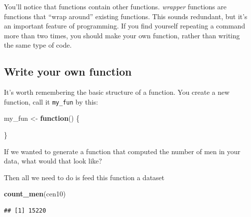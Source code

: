 \documentclass[
]{book}
\newenvironment{Shaded}{\begin{snugshade}}{\end{snugshade}}
\newcommand{\ControlFlowTok}[1]{\textcolor[rgb]{0.13,0.29,0.53}{\textbf{#1}}}
\newcommand{\KeywordTok}[1]{\textcolor[rgb]{0.13,0.29,0.53}{\textbf{#1}}}
\newcommand{\NormalTok}[1]{#1}
\newcommand{\OperatorTok}[1]{\textcolor[rgb]{0.81,0.36,0.00}{\textbf{#1}}}
\newcommand{\StringTok}[1]{\textcolor[rgb]{0.31,0.60,0.02}{#1}}
\theoremstyle{definition}
\theoremstyle{definition}
\theoremstyle{definition}
\theoremstyle{definition}
\theoremstyle{remark}
\begin{document}
You'll notice that functions contain other functions. \emph{wrapper} functions are functions that ``wrap around'' existing functions. This sounds redundant, but it's an important feature of programming. If you find yourself repeating a command more than two times, you should make your own function, rather than writing the same type of code.

\hypertarget{write-your-own-function}{%
\subsection{Write your own function}\label{write-your-own-function}}

It's worth remembering the basic structure of a function. You create a new function, call it \texttt{my\_fun} by this:

\begin{Shaded}
\begin{Highlighting}[]
\NormalTok{my_fun <-}\StringTok{ }\ControlFlowTok{function}\NormalTok{() \{}
  
\NormalTok{\}}
\end{Highlighting}
\end{Shaded}

If we wanted to generate a function that computed the number of men in your data, what would that look like?

\begin{Shaded}
\end{Shaded}

Then all we need to do is feed this function a dataset

\begin{Shaded}
\begin{Highlighting}[]
\KeywordTok{count_men}\NormalTok{(cen10)}
\end{Highlighting}
\end{Shaded}

\begin{verbatim}
## [1] 15220
\end{verbatim}
\end{document}
